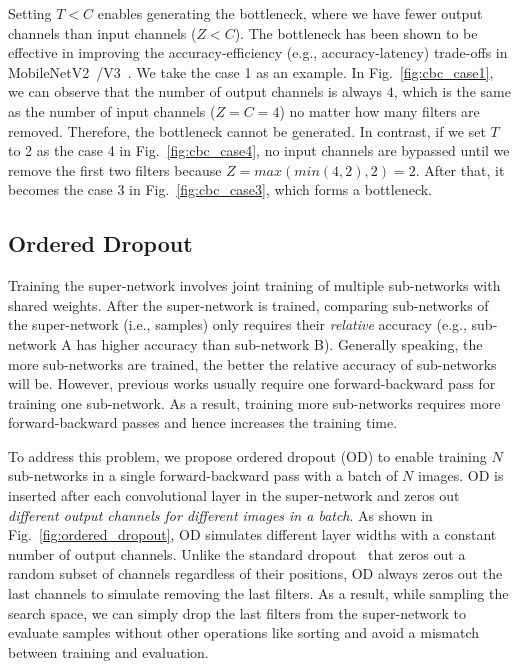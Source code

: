 Setting $T < C$ enables generating the bottleneck, where we have fewer output channels than input channels ($Z < C$). The bottleneck has been shown to be effective in improving the accuracy-efficiency (e.g., accuracy-latency) trade-offs in MobileNetV2~\cite{Sandler_2018_CVPR}/V3~\cite{Howard_2019_ICCV}. We take the case 1 as an example. In Fig.~\ref{fig:cbc_case1}, we can observe that the number of output channels is always $4$, which is the same as the number of input channels ($Z=C=4$) no matter how many filters are removed. Therefore, the bottleneck cannot be generated. In contrast, if we set $T$ to 2 as the case 4 in Fig.~\ref{fig:cbc_case4}, no input channels are bypassed until we remove the first two filters because $Z = max(min(4, 2), 2) = 2$. After that, it becomes the case 3 in Fig.~\ref{fig:cbc_case3}, which forms a bottleneck.


\subsection{Ordered Dropout}
\label{subsec:ordered_droput}

Training the super-network involves joint training of multiple sub-networks with shared weights. After the super-network is trained, comparing sub-networks of the super-network (i.e., samples) only requires their \emph{relative} accuracy (e.g., sub-network A has higher accuracy than sub-network B). Generally speaking, the more sub-networks are trained, the better the relative accuracy of sub-networks will be. However, previous works usually require one forward-backward pass for training one sub-network. As a result, training more sub-networks requires more forward-backward passes and hence increases the training time.

To address this problem, we propose ordered dropout (OD) to enable training $N$ sub-networks in a single forward-backward pass with a batch of $N$ images. OD is inserted after each convolutional layer in the super-network and zeros out \emph{different output channels for different images in a batch}. As shown in Fig.~\ref{fig:ordered_dropout}, OD simulates different layer widths with a constant number of output channels. Unlike the standard dropout~\cite{dropout} that zeros out a random subset of channels regardless of their positions, OD always zeros out the last channels to simulate removing the last filters. As a result, while sampling the search space, we can simply drop the last filters from the super-network to evaluate samples without other operations like sorting and avoid a mismatch between training and evaluation.


